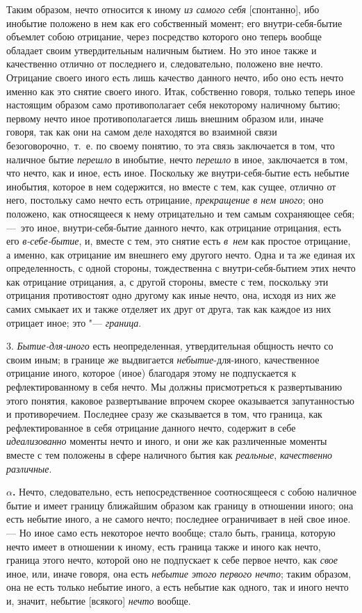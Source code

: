 Таким образом, нечто относится к иному {\em из самого
себя} [спонтанно], ибо инобытие положено в нем как его собственный
момент; его внутри-себя-бытие объемлет собою отрицание, через посредство
которого оно теперь вообще обладает своим утвердительным наличным бытием.
Но это иное также и качественно отлично от последнего и, следовательно,
положено вне нечто. Отрицание своего иного есть лишь качество данного
нечто, ибо оно есть нечто именно как это снятие своего иного. Итак,
собственно говоря, только теперь иное настоящим образом само
противополагает себя некоторому наличному бытию; первому нечто иное
противополагается лишь внешним образом или, иначе говоря, так как они на
самом деле находятся во взаимной связи безоговорочно,~т.~е. по своему
понятию, то эта связь заключается в том, что наличное бытие
{\em перешло} в инобытие, нечто
{\em перешло} в иное, заключается в том, что нечто,
как и иное, есть иное. Поскольку же внутри-себя-бытие есть небытие
инобытия, которое в нем содержится, но вместе с тем, как сущее, отлично от
него, постольку само нечто есть отрицание,
{\em прекращение в нем иного}; оно
положено, как относящееся к нему отрицательно и тем самым сохраняющее себя;
—~это иное, внутри-себя-бытие данного нечто, как отрицание отрицания,
есть его {\em в-себе-бытие}, и, вместе с тем, это
снятие есть {\em в~нем} как простое отрицание, а
именно, как отрицание им внешнего ему другого нечто. Одна и та же единая их
определенность, с одной стороны, тождественна с внутри-себя-бытием этих
нечто как отрицание отрицания, а, с другой стороны, вместе с тем, поскольку
эти отрицания противостоят одно другому как иные нечто, она, 
исходя из них же самих смыкает их и также отделяет их друг от друга, 
так как каждое из них отрицает иное; это "--- {\em граница}.

3. {\em Бытие-для-иного} есть неопределенная,
утвердительная общность нечто со своим иным; в границе же выдвигается
{\em небытие}-для-иного, качественное отрицание
иного, которое (иное) благодаря этому не подпускается к
рефлектированному в себя нечто. Мы должны присмотреться к развертыванию
этого понятия, каковое развертывание впрочем скорее оказывается
запутанностью и противоречием. Последнее сразу же сказывается в том, что
граница, как рефлектированное в себя отрицание данного нечто, содержит в
себе {\em идеализованно} моменты нечто и иного, и они
же как различенные моменты вместе с тем положены в сфере наличного бытия
как {\em реальные},
{\em качественно различные}.

{\bfseries $\alpha $.} Нечто, следовательно, есть непосредственное
соотносящееся с собою наличное бытие и имеет границу ближайшим образом как
границу в отношении иного; она есть небытие иного, а не самого нечто;
последнее ограничивает в ней свое иное. — Но иное само есть некоторое
нечто вообще; стало быть, граница, которую нечто имеет в отношении к
иному, есть граница также и иного как нечто, граница этого нечто,
которой оно не подпускает к себе первое нечто, как
{\em свое} иное, или, иначе говоря, она есть
{\em небытие этого первого нечто}; таким образом, она
не есть только небытие иного, а есть небытие как одного, так и иного
нечто и, значит, небытие [всякого] {\em нечто} вообще.

